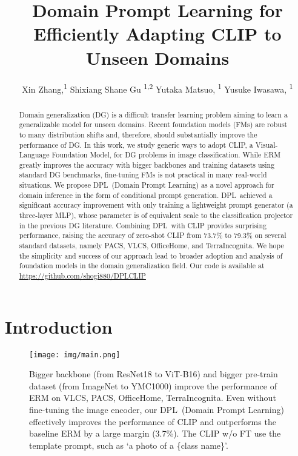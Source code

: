 \documentclass[letterpaper]{article} \usepackage[]{aaai23}
\title{Domain Prompt Learning for Efficiently Adapting CLIP to Unseen Domains}
\author {
Xin Zhang,\textsuperscript{\rm 1}
    Shixiang Shane Gu \textsuperscript{\rm 1,2}
    Yutaka Matsuo, \textsuperscript{\rm 1}
    Yusuke Iwasawa, \textsuperscript{\rm 1}
}
\newcommand{\dplshort}{DPL}
\newcommand{\dpllong}{Domain Prompt Learning}
\begin{document}
\maketitle


\begin{abstract}

Domain generalization (DG) is a difficult transfer learning problem aiming to learn a generalizable model for unseen domains. 
Recent foundation models (FMs) are robust to many distribution shifts and, therefore, should substantially improve the performance of DG.
In this work, we study generic ways to adopt CLIP, a Visual-Language Foundation Model, for DG problems in image classification.
While ERM greatly improves the accuracy with bigger backbones and training datasets using standard DG benchmarks, fine-tuning FMs is not practical in many real-world situations.
We propose \dplshort~(\dpllong) as a novel approach for domain inference in the form of conditional prompt generation.
\dplshort~achieved a significant accuracy improvement with only training a lightweight prompt generator (a three-layer MLP), whose parameter is of equivalent scale to the classification projector in the previous DG literature.
Combining \dplshort~with CLIP provides surprising performance, raising the accuracy of zero-shot CLIP from 73.7\% to 79.3\% on several standard datasets, namely PACS, VLCS, OfficeHome, and TerraIncognita.
We hope the simplicity and success of our approach lead to broader adoption and analysis of foundation models in the domain generalization field.
Our code is available at \url{https://github.com/shogi880/DPLCLIP}
\end{abstract}

\section{Introduction}

\begin{figure}[h]
\begin{center}
\texttt{[image: img/main.png]}
\end{center}
  \caption{
  Bigger backbone (from ResNet18 to ViT-B16) and bigger pre-train dataset (from ImageNet to YMC1000) improve the performance of ERM on VLCS, PACS, OfficeHome, TerraIncognita.
  Even without fine-tuning the image encoder, our \dplshort~(\dpllong) effectively improves the performance of CLIP and outperforms the baseline ERM by a large margin (3.7\%).
  The CLIP w/o FT use the template prompt, such as `a photo of a \{class name\}'.
 }
\label{fig:first_image}
\end{figure}
\end{document}
